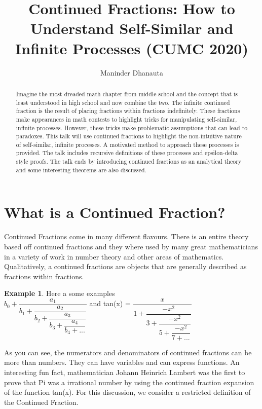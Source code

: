 \documentclass[psamsfonts]{amsart}
\title{Continued Fractions: How to Understand Self-Similar and Infinite Processes (CUMC 2020)}
\author{Maninder Dhanauta}
\theoremstyle{definition}
\newtheorem{exmp}[thm]{Example}
\theoremstyle{remark}
\numberwithin{equation}{section}
\begin{document}
\begin{abstract}

Imagine the most dreaded math chapter from middle school and the concept that is least understood in high school and now combine the two. The infinite continued fraction is the result of placing fractions within fractions indefinitely. These fractions make appearances in math contests to highlight tricks for manipulating self-similar, infinite processes. However, these tricks make problematic assumptions that can lead to paradoxes. This talk will use continued fractions to highlight the non-intuitive nature of self-similar, infinite processes. A motivated method to approach these processes is provided. The talk includes recursive definitions of these processes and epsilon-delta style proofs. The talk ends by introducing continued fractions as an analytical theory and some interesting theorems are also discussed.


\end{abstract}

\maketitle

\tableofcontents


\newpage
\section{What is a Continued Fraction?}

Continued Fractions come in many different flavours. There is an entire theory based off continued fractions and they where used by many great mathematicians in a variety of work in number theory and other areas of mathematics. Qualitatively, a continued fractions are objects that are generally described as fractions within fractions. 

\begin{exmp}Here a some examples \\

    $
          b_0 + \dfrac{a_1}{b_1 + \dfrac{a_2}{b_2 + \dfrac{a_3}{b_3 +  \dfrac{a_4}{b_4 + ...}}}}  
$
    and tan(x) =
    $
          \dfrac{x}{1+  \dfrac{-x^2}{3+  \dfrac{-x^2}{5+  \dfrac{-x^2}{7+... }}}}
    $
\end{exmp}

As you can see, the numerators and denominators of continued fractions can be more than numbers. They can have variables and can express functions. An interesting fun fact, mathematician Johann Heinrich Lambert was the first to prove that Pi was a irrational number by using the continued fraction expansion of the function tan(x). For this discussion, we consider a restricted definition of the Continued Fraction.
\end{document}
